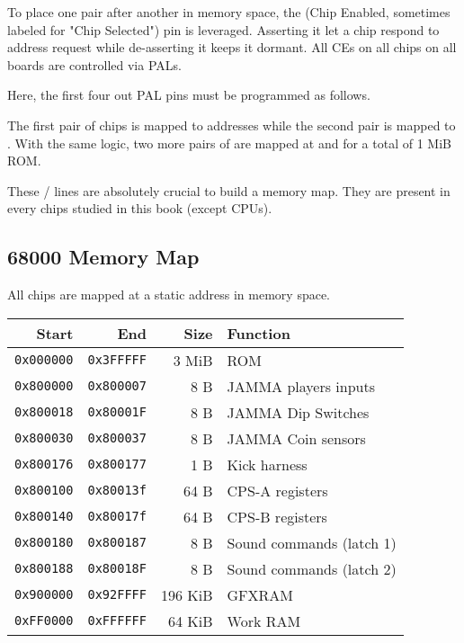 To place one pair after another in memory space, the  (Chip Enabled, sometimes labeled  for "Chip Selected") pin is leveraged. Asserting it let a chip respond to address request while de-asserting it keeps it dormant. All CEs on all chips on all boards are controlled via PALs.

Here, the first four out PAL pins must be programmed as follows.



The first pair of chips is mapped to addresses  while the second pair is mapped to . With the same logic, two more pairs of  are mapped at  and  for a total of 1 MiB ROM.




These  /  lines are absolutely crucial to build a memory map. They are present in every chips studied in this book (except CPUs).

\subsection{68000 Memory Map}

All chips are mapped at a static address in memory space.

\begin{tabularx}{\textwidth}{rrrX}
  \textbf{Start } & \textbf{End  } & \textbf{Size } & \textbf{Function } \\               
  \toprule    
  \texttt{0x000000} & \texttt{0x3FFFFF} & 3 MiB & ROM \\
  \toprule    
  \texttt{0x800000} & \texttt{0x800007} & 8 B & JAMMA players inputs \\
  \texttt{0x800018} & \texttt{0x80001F} & 8 B & JAMMA Dip Switches \\
  \texttt{0x800030} & \texttt{0x800037} & 8 B & JAMMA Coin sensors \\
  \texttt{0x800176} & \texttt{0x800177} & 1 B & Kick harness \\
\toprule    
  \texttt{0x800100} & \texttt{0x80013f} & 64 B & CPS-A registers\\
  \texttt{0x800140} & \texttt{0x80017f} & 64 B & CPS-B registers\\
\toprule    
  \texttt{0x800180} & \texttt{0x800187} & 8 B & Sound commands (latch 1)\\
  \texttt{0x800188} & \texttt{0x80018F} & 8 B & Sound commands (latch 2)\\
  \toprule    
  \texttt{0x900000} & \texttt{0x92FFFF} & 196 KiB & GFXRAM\\
  \texttt{0xFF0000} & \texttt{0xFFFFFF} & 64 KiB & Work RAM \\
\end{tabularx}%

